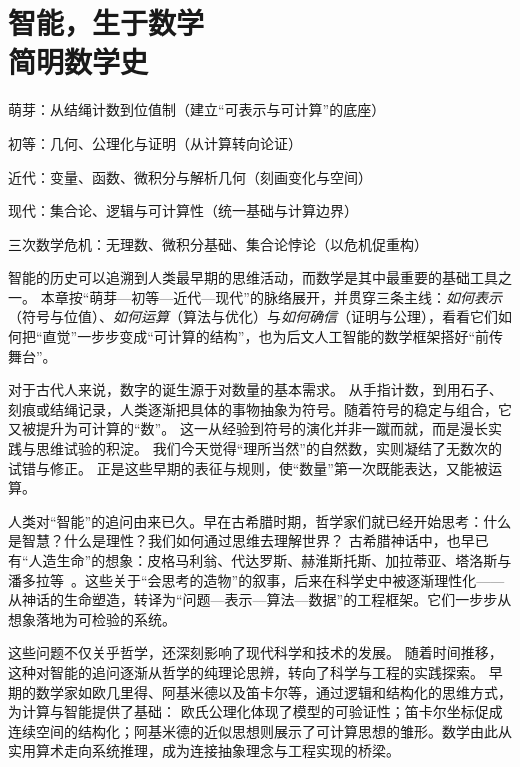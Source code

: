 \chapter{智能，生于数学 \texorpdfstring{\\}{ }简明数学史}

\begin{introduction}
\item 萌芽：从结绳计数到位值制（建立“可表示与可计算”的底座）
\item 初等：几何、公理化与证明（从计算转向论证）
\item 近代：变量、函数、微积分与解析几何（刻画变化与空间）
\item 现代：集合论、逻辑与可计算性（统一基础与计算边界）
\item 三次数学危机：无理数、微积分基础、集合论悖论（以危机促重构）
\end{introduction}


智能的历史可以追溯到人类最早期的思维活动，而数学是其中最重要的基础工具之一。
本章按“萌芽—初等—近代—现代”的脉络展开，并贯穿三条主线：\emph{如何表示}（符号与位值）、\emph{如何运算}（算法与优化）与\emph{如何确信}（证明与公理），看看它们如何把“直觉”一步步变成“可计算的结构”，也为后文人工智能的数学框架搭好“前传舞台”。

对于古代人来说，数字的诞生源于对数量的基本需求。  
从手指计数，到用石子、刻痕或结绳记录，人类逐渐把具体的事物抽象为符号。随着符号的稳定与组合，它又被提升为可计算的“数”。    
这一从经验到符号的演化并非一蹴而就，而是漫长实践与思维试验的积淀。  
我们今天觉得“理所当然”的自然数，实则凝结了无数次的试错与修正。
正是这些早期的表征与规则，使“数量”第一次既能表达，又能被运算。

人类对“智能”的追问由来已久。早在古希腊时期，哲学家们就已经开始思考：什么是智慧？什么是理性？我们如何通过思维去理解世界？
古希腊神话中，也早已有“人造生命”的想象：皮格马利翁、代达罗斯、赫淮斯托斯、加拉蒂亚、塔洛斯与潘多拉等~{\cite{OvidMartin2004,Sparkes1996,Tandy1997}}。这些关于“会思考的造物”的叙事，后来在科学史中被逐渐理性化——从神话的生命塑造，转译为“问题—表示—算法—数据”的工程框架。它们一步步从想象落地为可检验的系统。

这些问题不仅关乎哲学，还深刻影响了现代科学和技术的发展。
随着时间推移，这种对智能的追问逐渐从哲学的纯理论思辨，转向了科学与工程的实践探索。
早期的数学家如欧几里得、阿基米德以及笛卡尔等，通过逻辑和结构化的思维方式，为计算与智能提供了基础：
欧氏公理化体现了模型的可验证性；笛卡尔坐标促成连续空间的结构化；阿基米德的近似思想则展示了可计算思想的雏形。数学由此从实用算术走向系统推理，成为连接抽象理念与工程实现的桥梁。


